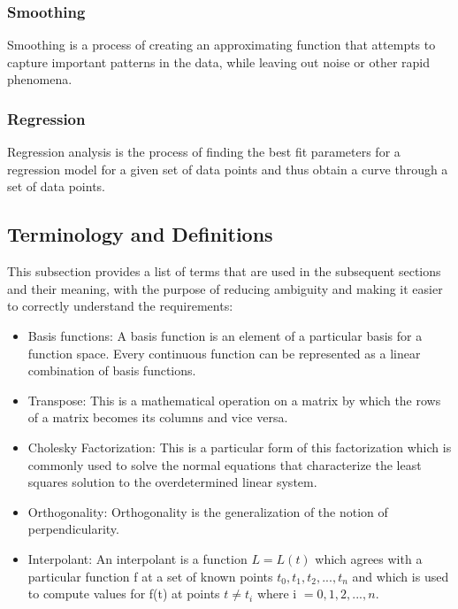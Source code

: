\documentclass[12pt]{article}
\begin{document}
\subsubsection{Smoothing}
Smoothing is a process of creating an approximating function that attempts to capture important patterns in the data, while leaving out noise or other rapid phenomena.

\subsubsection{Regression}
Regression analysis is the process of finding the best fit parameters for a regression model for a given set of data points and thus obtain a curve through a set of data points.

\subsection{Terminology and  Definitions}

This subsection provides a list of terms that are used in the subsequent
sections and their meaning, with the purpose of reducing ambiguity and making it
easier to correctly understand the requirements:

\begin{itemize}

\item Basis functions: A basis function is an element of a particular basis for a function space. Every continuous function can be represented as a linear combination of basis functions.

\item Transpose: This is a mathematical operation on a matrix by which the rows of a matrix becomes its columns and vice versa.

\item Cholesky Factorization: This is a particular form of this factorization which is commonly used to solve the normal equations that characterize the least squares solution to the overdetermined linear system.

\item Orthogonality: Orthogonality is the generalization of the notion of perpendicularity.

\item Interpolant: An interpolant is a function $L=L(t)$ which agrees with a particular function f at a set of known points $t_0,t_1,t_2,...,t_n$ and which is used to compute values for f(t) at points $t \neq t_i$ where i $=0,1,2,...,n$.

\end{itemize}
\end{document}
